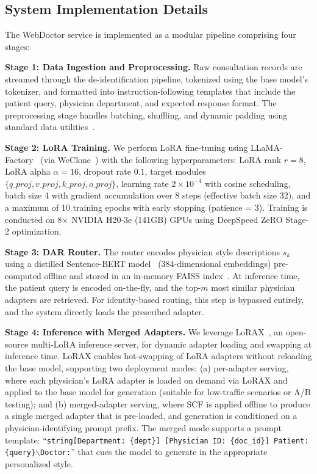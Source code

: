 \subsection*{System Implementation Details}

The WebDoctor service is implemented as a modular pipeline comprising four stages:

\textbf{Stage 1: Data Ingestion and Preprocessing.} Raw consultation records are streamed through the de-identification pipeline, tokenized using the base model's tokenizer, and formatted into instruction-following templates that include the patient query, physician department, and expected response format. The preprocessing stage handles batching, shuffling, and dynamic padding using standard data utilities~\cite{zheng2024llamafactory}.

\textbf{Stage 2: LoRA Training.} We perform LoRA fine-tuning using LLaMA-Factory~\cite{zheng2024llamafactory} (via WeClone~\cite{xmingXming521WeClone2026}) with the following hyperparameters: LoRA rank $r = 8$, LoRA alpha $\alpha = 16$, dropout rate $0.1$, target modules $\{q\_proj, v\_proj, k\_proj, o\_proj\}$, learning rate $2 \times 10^{-4}$ with cosine scheduling, batch size 4 with gradient accumulation over 8 steps (effective batch size 32), and a maximum of 10 training epochs with early stopping (patience = 3). Training is conducted on 8$\times$ NVIDIA H20-3e (141GB) GPUs using DeepSpeed ZeRO Stage-2 optimization.

\textbf{Stage 3: DAR Router.} The router encodes physician style descriptions $s_k$ using a distilled Sentence-BERT model~\cite{reimers2019sentence} (384-dimensional embeddings) pre-computed offline and stored in an in-memory FAISS index~\cite{johnson2019faiss}. At inference time, the patient query is encoded on-the-fly, and the top-$m$ most similar physician adapters are retrieved. For identity-based routing, this step is bypassed entirely, and the system directly loads the prescribed adapter.

\textbf{Stage 4: Inference with Merged Adapters.} We leverage LoRAX~\cite{PredibaseLorax2026}, an open-source multi-LoRA inference server, for dynamic adapter loading and swapping at inference time. LoRAX enables hot-swapping of LoRA adapters without reloading the base model, supporting two deployment modes: (a) per-adapter serving, where each physician's LoRA adapter is loaded on demand via LoRAX and applied to the base model for generation (suitable for low-traffic scenarios or A/B testing); and (b) merged-adapter serving, where SCF is applied offline to produce a single merged adapter that is pre-loaded, and generation is conditioned on a physician-identifying prompt prefix. The merged mode supports a prompt template: ``\texttt{string[Department: \{dept\}] [Physician ID: \{doc\_id\}] Patient: \{query\}$\backslash$Doctor:}'' that cues the model to generate in the appropriate personalized style.




